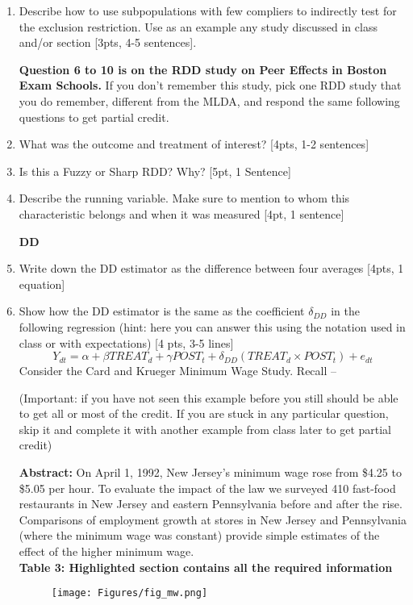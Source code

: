 \documentclass[answers]{exam}
\begin{document}
\begin{enumerate}
\newpage

\item Describe how to use subpopulations with few compliers to indirectly test for the exclusion restriction. Use as an example any study discussed in class and/or section [3pts, 4-5 sentences].
\vspace{4cm}


\textbf{Question 6 to 10 is on the RDD study on Peer Effects in Boston Exam Schools.} If you don’t remember this study, pick one RDD study that you do remember, different from the MLDA, and respond the same following questions to get partial credit.
\item What was the outcome and treatment of interest? [4pts, 1-2 sentences]

\vspace{4cm}
\item Is this a Fuzzy or Sharp RDD? Why? [5pt, 1 Sentence]
\vspace{4cm}
\item Describe the running variable. Make sure to mention to whom this characteristic belongs and when it was measured [4pt, 1 sentence]

\vspace{6cm}

\newpage

\textbf{DD}
\item Write down the DD estimator as the difference between four averages [4pts, 1 equation]
\vspace{4cm}
\item Show how the DD estimator is the same as the coefficient $\delta_{DD}$ in the following regression (hint: here you can answer this using the notation used in class or with expectations) [4 pts, 3-5 lines]
$$
Y_{d t}=\alpha+\beta T R E A T_{d}+\gamma P O S T_{t}+\delta_{D D}\left(T R E A T_{d} \times P O S T_{t}\right)+e_{d t}
$$
\vspace{4cm}
\clearpage
Consider the Card and Krueger Minimum Wage Study. Recall --   

(Important: if you have not seen this example before you still should be able to get all or most of the credit. If you are stuck in any particular question, skip it and complete it with another example from class later to get partial credit)

\textbf{Abstract:} 
On April 1, 1992, New Jersey's minimum wage rose from \$4.25 to \$5.05 per hour. To evaluate the impact of the law we surveyed 410 fast-food restaurants in New Jersey and eastern Pennsylvania before and after the rise. Comparisons of employment growth at stores in New Jersey and Pennsylvania (where the minimum wage was constant) provide simple estimates of the effect of the higher minimum wage.
\\
\textbf{Table 3: Highlighted section contains all the required information}
 \begin{figure}[H]
    \centering
    \texttt{[image: Figures/fig\_mw.png]}
    \label{}
\end{figure}



\end{enumerate}
\end{document}
